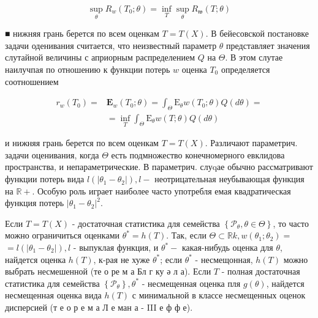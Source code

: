 \documentclass[10pt]{article}
\begin{document}
\[

\sup _{\theta} R_{w}\left(T_{0} ; \theta\right)=\inf _{T} \sup _{\theta} R_{\mathfrak{w}}(T ; \theta)

\]



■ нижняя грань берется по всем оценкам $T=T(X)$. В бейесовской постановке задачи оденивания считается, что неизвестный параметр $\theta$ представляет значения слутайной величины с априорным распределением $Q$ на $\Theta$. В этом слутае наилучпая по отношению к функции потерь $w$ оценка $T_{0}$ определяется соотношением



\[

\begin{aligned}

r_{w}\left(T_{0}\right)= & \mathbf{E}_{w}\left(T_{0} ; \theta\right)=\int_{\Theta} \mathrm{E}_{\theta} w\left(T_{0} ; \theta\right) Q(d \theta)= \\

& =\inf _{T} \int_{\Theta} \mathrm{E}_{\theta} w(T ; \theta) Q(d \theta)

\end{aligned}

\]



и нижняя грань берется по всем оценкам $T=T(X)$. Различают параметрич. задачи оценивания, когда $\Theta$ есть подмножество конечномерного евклидова пространства, и непараметрические. В параметрич. слуqае обычно рассматривают функции потерь вида $l\left(\left|\theta_{1}-\theta_{2}\right|\right), l-$ неотрицательная неубывающая функция на $\mathbb{R}+$. Особую роль играет наиболее часто употребля емая квадратическая функция потерь $\left|\theta_{1}-\theta_{2}\right|^{2}$.



Если $T=T(X)$ - достаточная статистика для семейства $\left\{\mathscr{P}_{\theta}, \theta \in \Theta\right\}$, то часто можно ограничиться оценками $\theta^{*}=h(T)$. Так, если $\Theta \subset \mathbb{R} k, w\left(\theta_{1} ; \theta_{2}\right)=$ $=l\left(\left|\theta_{1}-\theta_{2}\right|\right), l$ - выпуклая функция, и $\theta^{*}-$ какая-нибудь оценка для $\theta$, найдется оценка $h(T)$, к-рая не хуже $\theta^{*}$; если $\theta^{*}$ - несмещонная, $h(T)$ можно выбрать несмешенной (те о ре м а Бл г ку ә л а). Если $T$ - полная достаточная статистика для семейства $\left\{\mathscr{P}_{\theta}\right\}, \theta^{*}$ - несмещенная оценка пля $g(\theta)$, найдется несмещенная оценка вида $h(T)$ с минимальной в классе несмещенных оценок дисперсией (т е о р е м а Л е ман а - III е ф ф е).
\end{document}
